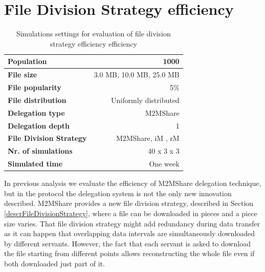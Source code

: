 
\newpage 
\section{File Division Strategy efficiency}
\begin{table}[h]
\begin{center}
\begin{tabular}{|l|r|}
\hline
\bfseries Population & 1000 \\
\hline
\bfseries File size & 3.0 MB, 10.0 MB, 25.0 MB \\
\hline
\bfseries File popularity & 5\% \\
\hline
\bfseries File distribution & Uniformly distributed \\
\hline
\bfseries Delegation type & M2MShare \\
\hline
\bfseries Delegation depth & 1 \\
\hline
\bfseries File Division Strategy & M2MShare, iM , rM \\
\hline
\bfseries Nr. of simulations & 40 x 3 x 3\\
\hline
\bfseries Simulated time & One week \\
\hline
\end{tabular}
\end{center}
\caption{Simulations settings for evaluation of file division strategy efficiency efficiency\label{tab:settingsFDS}}
\end{table}
In previous analysis we evaluate the efficiency of M2MShare delegation technique, but in the protocol the delegation system is not the only new innovation described. M2MShare provides a new file division strategy, described in Section \ref{descrFileDivisionStrategy}, where a file can be downloaded in pieces and a piece size varies. That file division strategy might add redundancy during data transfer as it can happen that overlapping data intervals are simultaneously downloaded by different servants. However, the fact that each servant is asked to download the file starting from different points allows reconstructing the whole file even if both downloaded just part of it. \\
